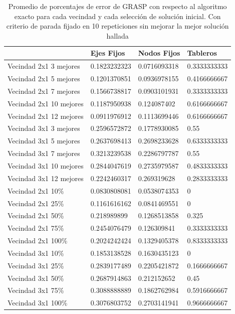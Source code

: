 \begin{table}[h!]
	\begin{tabular}[c]{|l|l|l|l|}
	\hline & Ejes Fijos & Nodos Fijos & Tableros \\
	\hline Vecindad 2x1 3 mejores & 0.1823232323 & 0.0716093318 & 0.3333333333 \\
	\hline Vecindad 2x1 5 mejores & 0.1201370851 & 0.0936978155 & 0.4166666667 \\
	\hline Vecindad 2x1 7 mejores & 0.1566738817 & 0.0903101931 & 0.3333333333 \\
	\hline Vecindad 2x1 10 mejores & 0.1187950938 & 0.124087402 & 0.6166666667 \\
	\hline Vecindad 2x1 12 mejores & 0.0911976912 & 0.1113699446 & 0.6166666667 \\
	\hline Vecindad 3x1 3 mejores & 0.2596572872 & 0.1778930085 & 0.55 \\
	\hline Vecindad 3x1 5 mejores & 0.2637698413 & 0.2698233628 & 0.6333333333 \\
	\hline Vecindad 3x1 7 mejores & 0.3213239538 & 0.2286797787 & 0.55 \\
	\hline Vecindad 3x1 10 mejores & 0.2844047619 & 0.2735979587 & 0.4833333333 \\
	\hline Vecindad 3x1 12 mejores & 0.2242460317 & 0.269319628 & 0.2833333333 \\
	\hline Vecindad 2x1 10\% & 0.0830808081 & 0.0538074353 & 0 \\
	\hline Vecindad 2x1 25\% & 0.1161616162 & 0.0841469551 & 0 \\
	\hline Vecindad 2x1 50\% & 0.218989899 & 0.1268513858 & 0.325 \\
	\hline Vecindad 2x1 75\% & 0.2454076479 & 0.126309841 & 0.3333333333 \\
	\hline Vecindad 2x1 100\% & 0.2024242424 & 0.1329405378 & 0.8333333333 \\
	\hline Vecindad 3x1 10\% & 0.1853138528 & 0.1630435123 & 0 \\
	\hline Vecindad 3x1 25\% & 0.2839177489 & 0.2205421872 & 0.1666666667 \\
	\hline Vecindad 3x1 50\% & 0.2687914863 & 0.212152652 & 0.45 \\
	\hline Vecindad 3x1 75\% & 0.3088888889 & 0.1862762984 & 0.5916666667 \\
	\hline Vecindad 3x1 100\% & 0.3076803752 & 0.2703141941 & 0.9666666667 \\
	\hline
	\end{tabular}
\caption{Promedio de porcentajes de error de GRASP con respecto al algoritmo exacto para cada vecindad y cada selecci\'on de soluci\'on inicial. Con criterio de parada fijado en 10 repeticiones sin mejorar la mejor soluci\'on hallada}
\end{table}

